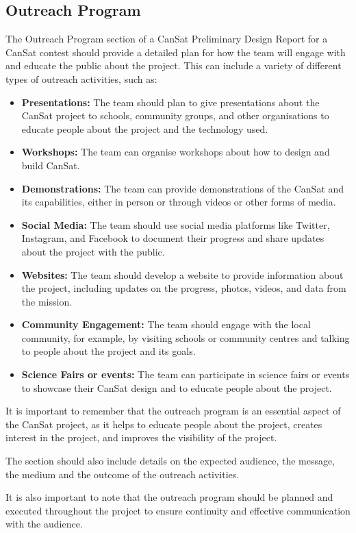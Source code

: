 \documentclass[11pt]{article}
\begin{document}
\subsection{Outreach Program}
The Outreach Program section of a CanSat Preliminary Design Report for a CanSat contest should provide a detailed plan for how the team will engage with and educate the public about the project. This can include a variety of different types of outreach activities, such as:
\begin{itemize}
  \item \textbf{Presentations:} The team should plan to give presentations about the CanSat project to schools, community groups, and other organisations to educate people about the project and the technology used.
  \item \textbf{Workshops:} The team can organise workshops about how to design and build CanSat.
  \item \textbf{Demonstrations:} The team can provide demonstrations of the CanSat and its capabilities, either in person or through videos or other forms of media.
  \item \textbf{Social Media:} The team should use social media platforms like Twitter, Instagram, and Facebook to document their progress and share updates about the project with the public.
  \item \textbf{Websites:} The team should develop a website to provide information about the project, including updates on the progress, photos, videos, and data from the mission.
  \item \textbf{Community Engagement:} The team should engage with the local community, for example, by visiting schools or community centres and talking to people about the project and its goals.
  \item \textbf{Science Fairs or events:} The team can participate in science fairs or events to showcase their CanSat design and to educate people about the project.
\end{itemize}

It is important to remember that the outreach program is an essential aspect of the CanSat project, as it helps to educate people about the project, creates interest in the project, and improves the visibility of the project.

The section should also include details on the expected audience, the message, the medium and the outcome of the outreach activities.

It is also important to note that the outreach program should be planned and executed throughout the project to ensure continuity and effective communication with the audience.
\end{document}
